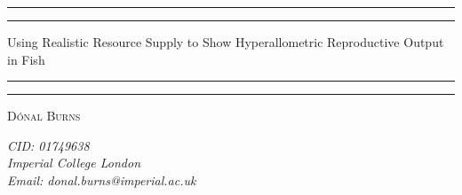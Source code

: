 \begin{titlepage} %
	
	\centering %
	
	\scshape %
	
	
	
	\rule{\textwidth}{1.6pt}\vspace*{-\baselineskip}\vspace*{2pt} %
	\rule{\textwidth}{0.4pt} %
	
	\vspace{0.75\baselineskip} %
	
	{\LARGE Using Realistic Resource Supply to Show Hyperallometric Reproductive Output in Fish\\} %
	
	\vspace{0.75\baselineskip} %
	
	\rule{\textwidth}{0.4pt}\vspace*{-\baselineskip}\vspace{3.2pt} %
	\rule{\textwidth}{1.6pt} %
	
	\vspace{1\baselineskip} %
	
	
	
	
	\vspace{0.5\baselineskip} %
	
	{\scshape\Large D\'onal Burns  \\} %
	
	\vspace{0.5\baselineskip} %
	
	\textit{CID: 01749638 \\ Imperial College London \\ Email: donal.burns@imperial.ac.uk} %
	

\end{titlepage}
